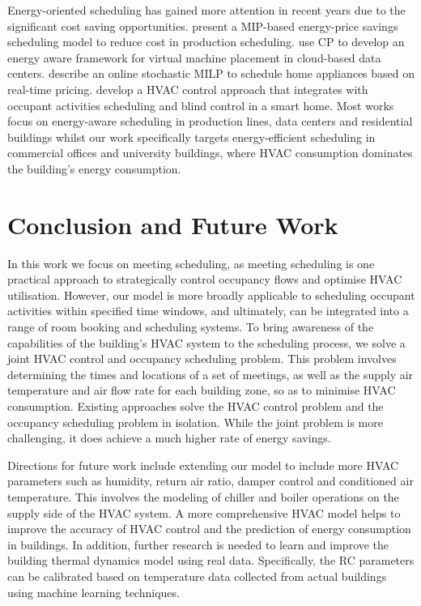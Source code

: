 Energy-oriented scheduling has gained more attention in recent years due to the significant cost saving opportunities. 
\cite{ifrim2012properties} present a MIP-based energy-price savings scheduling model to reduce cost in production scheduling. \cite{dupont2012energy} use CP to develop an energy aware framework for virtual machine placement in cloud-based data centers. \cite{scott2013residential} describe an online stochastic MILP to schedule home appliances based on real-time pricing. \cite{ono2012risk} develop a HVAC control approach that integrates with occupant activities scheduling and blind control in a smart home.  Most works focus on energy-aware scheduling in production lines, data centers and residential buildings whilst our work specifically targets energy-efficient scheduling in commercial offices and university buildings, where HVAC consumption dominates the building's energy consumption. 



\section{Conclusion and Future Work}
\label{sec:mip:conclusion}

In this work we focus on meeting scheduling, as meeting scheduling is one practical approach to strategically control occupancy flows and optimise HVAC utilisation. However, our model is more broadly applicable to scheduling occupant activities within specified time windows, and ultimately, can be integrated into a range of room booking and scheduling systems. To bring awareness of the capabilities of the building's HVAC system to the scheduling process, we solve a joint HVAC control and occupancy scheduling problem. This problem involves determining the times and locations of a set of meetings, as well as the supply air temperature and air flow rate for  each building zone, so as to minimise HVAC consumption. Existing approaches solve the HVAC control problem and the occupancy scheduling problem in isolation. While the joint problem is more challenging, it does achieve a much higher rate of energy savings. 

Directions for future work include extending our model to include more HVAC parameters such as humidity, return air ratio, damper control and conditioned air temperature. This involves the modeling of chiller and boiler operations on the supply side of the HVAC system. A more comprehensive HVAC model helps to improve the accuracy of HVAC control and the prediction of energy consumption in buildings. In addition, further research is needed to learn and improve the building thermal dynamics model using real data. Specifically, the RC parameters can be calibrated based on temperature data collected from actual buildings using machine learning techniques. 

